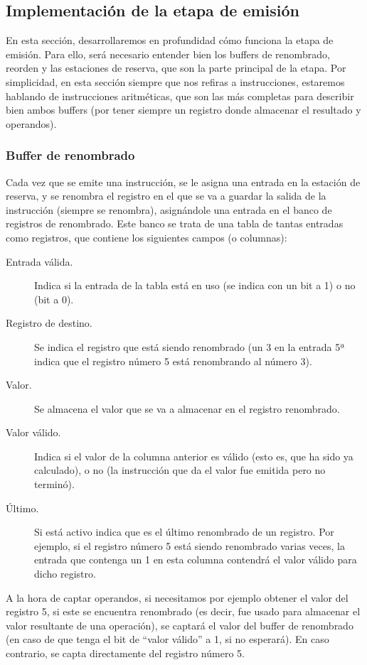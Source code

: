 \subsection{Implementación de la etapa de emisión}
En esta sección, desarrollaremos en profundidad cómo funciona la etapa de emisión. Para ello, será necesario entender bien los buffers de renombrado, reorden y las estaciones de reserva, que son la parte principal de la etapa. Por simplicidad, en esta sección siempre que nos refiras a instrucciones, estaremos hablando de instrucciones aritméticas, que son las más completas para describir bien ambos buffers (por tener siempre un registro donde almacenar el resultado y operandos).

\subsubsection{Buffer de renombrado}
Cada vez que se emite una instrucción, se le asigna una entrada en la estación de reserva, y se renombra el registro en el que se va a guardar la salida de la instrucción (siempre se renombra), asignándole una entrada en el banco de registros de renombrado. Este banco se trata de una tabla de tantas entradas como registros, que contiene los siguientes campos (o columnas):

\begin{description}
    \item [Entrada válida.] Indica si la entrada de la tabla está en uso (se indica con un bit a 1) o no (bit a 0).
    \item [Registro de destino.] Se indica el registro que está siendo renombrado (un 3 en la entrada 5ª indica que el registro número 5 está renombrando al número 3).
    \item [Valor.] Se almacena el valor que se va a almacenar en el registro renombrado.
    \item [Valor válido.] Indica si el valor de la columna anterior es válido (esto es, que ha sido ya calculado), o no (la instrucción que da el valor fue emitida pero no terminó).
    \item [Último.] Si está activo indica que es el último renombrado de un registro. Por ejemplo, si el registro número 5 está siendo renombrado varias veces, la entrada que contenga un 1 en esta columna contendrá el valor válido para dicho registro.
\end{description}
A la hora de captar operandos, si necesitamos por ejemplo obtener el valor del registro 5, si este se encuentra renombrado (es decir, fue usado para almacenar el valor resultante de una operación), se captará el valor del buffer de renombrado (en caso de que tenga el bit de ``valor válido'' a 1, si no esperará). En caso contrario, se capta directamente del registro número 5.\\

